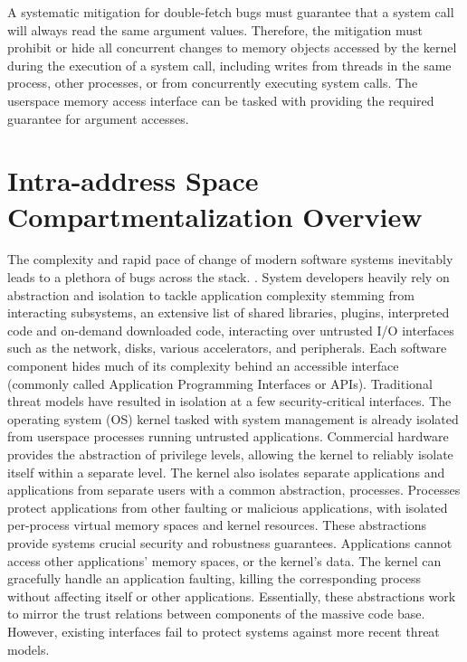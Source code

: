A systematic mitigation for double-fetch bugs must guarantee that a system call
will always read the same argument values.
Therefore, the mitigation must prohibit or hide all 
concurrent changes to memory objects accessed by the kernel 
during the execution of a system call, 
including writes from threads in the same process, other processes, 
or from concurrently executing system calls.
The userspace memory access interface can be tasked with providing
the required guarantee for argument accesses.

\section{Intra-address Space Compartmentalization Overview}

The complexity and rapid pace of change of modern software systems inevitably
leads to a plethora of bugs across the stack.
.
System developers heavily rely on abstraction and isolation to tackle
application complexity stemming from interacting subsystems, 
an extensive list of shared libraries, 
plugins, interpreted code and on-demand downloaded code, interacting over 
untrusted I/O interfaces such as the network, disks, 
various accelerators, and peripherals.
Each software component hides much of its complexity behind an accessible
interface (commonly called Application Programming Interfaces or APIs).
Traditional threat models have resulted in isolation at a few 
security-critical interfaces.
The operating system (OS) kernel tasked with system management is already
isolated from userspace processes running untrusted applications.
Commercial hardware provides the abstraction of privilege levels, 
allowing the kernel to reliably isolate itself within a separate level.
The kernel also isolates separate applications and applications from
separate users with a common abstraction, processes.
Processes protect applications from other faulting or malicious applications,
with isolated per-process virtual memory spaces and kernel resources.
These abstractions provide systems crucial security and robustness 
guarantees.
Applications cannot access other applications' memory spaces, or the
kernel's data.
The kernel can gracefully handle an application faulting, killing the
corresponding process without affecting itself or other applications.
Essentially, these abstractions work to mirror the trust relations between
components of the massive code base.
However, existing interfaces fail to protect systems against more recent
threat models.

